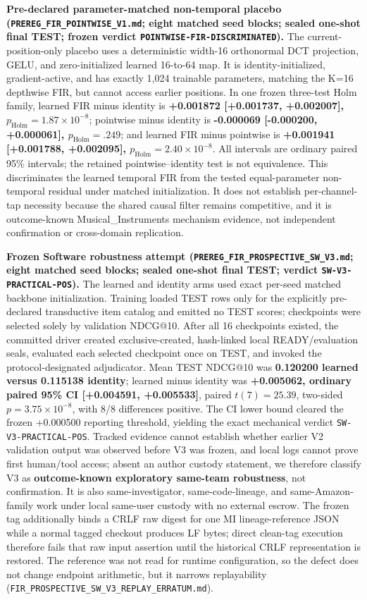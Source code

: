 \textbf{Pre-declared parameter-matched non-temporal placebo (\texttt{PREREG\_FIR\_POINTWISE\_V1.md}; eight matched seed blocks; sealed one-shot final TEST; frozen verdict \texttt{POINTWISE-FIR-DISCRIMINATED}).} The current-position-only placebo uses a deterministic width-16 orthonormal DCT projection, GELU, and zero-initialized learned 16-to-64 map. It is identity-initialized, gradient-active, and has exactly 1,024 trainable parameters, matching the K=16 depthwise FIR, but cannot access earlier positions. In one frozen three-test Holm family, learned FIR minus identity is \textbf{+0.001872 [+0.001737, +0.002007], $p_{\mathrm{Holm}}=1.87\times10^{-8}$}; pointwise minus identity is \textbf{-0.000069 [-0.000200, +0.000061], $p_{\mathrm{Holm}}=.249$}; and learned FIR minus pointwise is \textbf{+0.001941 [+0.001788, +0.002095], $p_{\mathrm{Holm}}=2.40\times10^{-8}$}. All intervals are ordinary paired 95\% intervals; the retained pointwise--identity test is not equivalence. This discriminates the learned temporal FIR from the tested equal-parameter non-temporal residual under matched initialization. It does not establish per-channel-tap necessity because the shared causal filter remains competitive, and it is outcome-known Musical\_Instruments mechanism evidence, not independent confirmation or cross-domain replication.

\textbf{Frozen Software robustness attempt (\texttt{PREREG\_FIR\_PROSPECTIVE\_SW\_V3.md}; eight matched seed blocks; sealed one-shot final TEST; verdict \texttt{SW-V3-PRACTICAL-POS}).} The learned and identity arms used exact per-seed matched backbone initialization.
Training loaded TEST rows only for the explicitly pre-declared transductive item catalog and emitted no TEST scores; checkpoints were selected solely by validation NDCG@10.
After all 16 checkpoints existed, the committed driver created exclusive-created, hash-linked local READY/evaluation seals, evaluated each selected checkpoint once on TEST, and invoked the protocol-designated adjudicator.
Mean TEST NDCG@10 was \textbf{0.120200 learned versus 0.115138 identity}; learned minus identity was \textbf{+0.005062, ordinary paired 95\% CI [+0.004591, +0.005533]}, paired $t(7)=25.39$, two-sided $p=3.75\times10^{-8}$, with 8/8 differences positive.
The CI lower bound cleared the frozen +0.000500 reporting threshold, yielding the exact mechanical verdict \texttt{SW-V3-PRACTICAL-POS}.
Tracked evidence cannot establish whether earlier V2 validation output was observed before V3 was frozen, and local logs cannot prove first human/tool access; absent an author custody statement, we therefore classify V3 as \textbf{outcome-known exploratory same-team robustness}, not confirmation.
It is also same-investigator, same-code-lineage, and same-Amazon-family work under local same-user custody with no external escrow. The frozen tag additionally binds a CRLF raw digest for one MI lineage-reference JSON while a normal tagged checkout produces LF bytes; direct clean-tag execution therefore fails that raw input assertion until the historical CRLF representation is restored. The reference was not read for runtime configuration, so the defect does not change endpoint arithmetic, but it narrows replayability (\texttt{FIR\_PROSPECTIVE\_SW\_V3\_REPLAY\_ERRATUM.md}).

